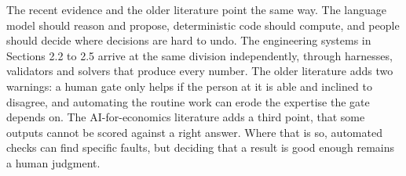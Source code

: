 The recent evidence and the older literature point the same way.
The language model should reason and propose, deterministic code should compute, and people should decide where decisions are hard to undo.
The engineering systems in Sections 2.2 to 2.5 arrive at the same division independently, through harnesses, validators and solvers that produce every number.
The older literature adds two warnings: a human gate only helps if the person at it is able and inclined to disagree, and automating the routine work can erode the expertise the gate depends on.
The AI-for-economics literature adds a third point, that some outputs cannot be scored against a right answer.
Where that is so, automated checks can find specific faults, but deciding that a result is good enough remains a human judgment.
